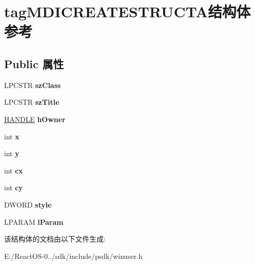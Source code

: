 \hypertarget{structtag_m_d_i_c_r_e_a_t_e_s_t_r_u_c_t_a}{}\section{tag\+M\+D\+I\+C\+R\+E\+A\+T\+E\+S\+T\+R\+U\+C\+T\+A结构体 参考}
\label{structtag_m_d_i_c_r_e_a_t_e_s_t_r_u_c_t_a}
\subsection*{Public 属性}
\begin{DoxyCompactItemize}
\item 
\mbox{\label{structtag_m_d_i_c_r_e_a_t_e_s_t_r_u_c_t_a_a6101a19f160975b40cf0766950035baa}} 
L\+P\+C\+S\+TR {\bfseries sz\+Class}
\item 
\mbox{\label{structtag_m_d_i_c_r_e_a_t_e_s_t_r_u_c_t_a_ad4d861a8a6b040cb2958d7ed440b8241}} 
L\+P\+C\+S\+TR {\bfseries sz\+Title}
\item 
\mbox{\label{structtag_m_d_i_c_r_e_a_t_e_s_t_r_u_c_t_a_ad90b6b346b938ab43a41e60c42f0fa24}} 
\hyperlink{interfacevoid}{H\+A\+N\+D\+LE} {\bfseries h\+Owner}
\item 
\mbox{\label{structtag_m_d_i_c_r_e_a_t_e_s_t_r_u_c_t_a_a70b1024770b95d6cc6db77f79ff38cd9}} 
int {\bfseries x}
\item 
\mbox{\label{structtag_m_d_i_c_r_e_a_t_e_s_t_r_u_c_t_a_a40f26958b4ce3b4f27e81f4691e1d2fd}} 
int {\bfseries y}
\item 
\mbox{\label{structtag_m_d_i_c_r_e_a_t_e_s_t_r_u_c_t_a_aaf7f6777a6e8f4ae0af759a542dba83a}} 
int {\bfseries cx}
\item 
\mbox{\label{structtag_m_d_i_c_r_e_a_t_e_s_t_r_u_c_t_a_a0dca45997f9f42851480438dbea29c44}} 
int {\bfseries cy}
\item 
\mbox{\label{structtag_m_d_i_c_r_e_a_t_e_s_t_r_u_c_t_a_a61c82df0a928e6c21886980e08f07488}} 
D\+W\+O\+RD {\bfseries style}
\item 
\mbox{\label{structtag_m_d_i_c_r_e_a_t_e_s_t_r_u_c_t_a_a2ba9857caaec6b7dacc9925d7350c0d0}} 
L\+P\+A\+R\+AM {\bfseries l\+Param}
\end{DoxyCompactItemize}


该结构体的文档由以下文件生成\+:\begin{DoxyCompactItemize}
\item 
E\+:/\+React\+O\+S-\/0../sdk/include/psdk/winuser.\+h\end{DoxyCompactItemize}
